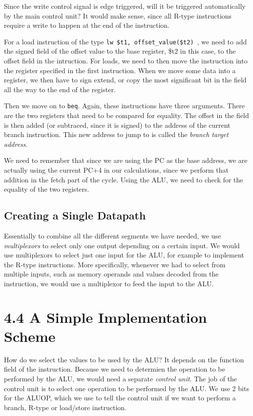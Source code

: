 \documentclass{article}
\begin{document}
Since the write control signal is edge triggered, will it be triggered automatically by the main control unit?
It would make sense, since all R-type instructions require a write to happen at the end of the instruction.


For a load instruction of the type \texttt{lw \$t1, offset\_value(\$t2) }, we need to add the signed field of the
offset value to the base register, \$t2 in this case, to the offset field in the intruction. For loads, we need
to then move the instruction into the register specified in the first instruction. When we move some data into
a register, we then have to sign extend, or copy the most significant bit in the field all the way to the end
of the register.

Then we move on to \texttt{beq}. Again, these instructions have three arguments. There are the two registers
that need to be compared for equality. The offset in the field is then added (or subtraced, since it is signed) 
to the address of the current branch instruction. This new address to jump to is called the \textit{branch 
target address}.
 
We need to remember that since we are using the PC as the base address, we are actually using the current PC+4
in our calculations, since we perform that addition in the fetch part of the cycle. Using the ALU, we need 
to check for the equality of the two registers.
\subsection{ Creating a Single Datapath}
Essentially to combine all the different segments we have needed, we use \textit{multiplexors} to select only 
one output depending on a certain input. We would use multiplexors to select just one input for the ALU,
for example to implement the R-type instructions. More specifically, whenever we had to select from 
multiple inputs, such as memory operands and values decoded from the instruction, we would use a multiplexor
to feed the input to the ALU.
\section{4.4 A Simple Implementation Scheme}
How do we select the values to be used by the ALU? It depends on the function field of the instruction. Because
we need to determien the operation to be performed by the ALU, we would need a separate \textit{control unit}.
The job of the control unit is to select one operation to be performed by the ALU. We use 2 bits for the ALUOP,
which we use to tell the control unit if we want to perform a branch, R-type or load/store instruction.
\end{document}

